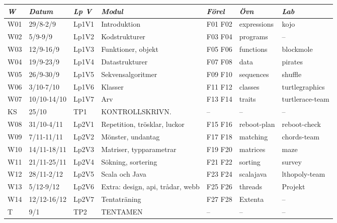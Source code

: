 \begin{tabular}{l|l|l|l|l|l|l}
\textit{W} & \textit{Datum} & \textit{Lp V} & \textit{Modul} & \textit{Förel} & \textit{Övn} & \textit{Lab} \\ \hline \hline
W01 & 29/8-2/9 & Lp1V1 & Introduktion & F01 F02 & expressions & kojo \\
W02 & 5/9-9/9 & Lp1V2 & Kodstrukturer & F03 F04 & programs & -- \\
W03 & 12/9-16/9 & Lp1V3 & Funktioner, objekt & F05 F06 & functions & blockmole \\
W04 & 19/9-23/9 & Lp1V4 & Datastrukturer & F07 F08 & data & pirates \\
W05 & 26/9-30/9 & Lp1V5 & Sekvensalgoritmer & F09 F10 & sequences & shuffle \\
W06 & 3/10-7/10 & Lp1V6 & Klasser & F11 F12 & classes & turtlegraphics \\
W07 & 10/10-14/10 & Lp1V7 & Arv & F13 F14 & traits & turtlerace-team \\
KS & 25/10 & TP1 & KONTROLLSKRIVN. & -- & -- & -- \\
W08 & 31/10-4/11 & Lp2V1 & Repetition, trösklar, luckor & F15 F16 & reboot-plan & reboot-check \\
W09 & 7/11-11/11 & Lp2V2 & Mönster, undantag & F17 F18 & matching & chords-team \\
W10 & 14/11-18/11 & Lp2V3 & Matriser, typparametrar & F19 F20 & matrices & maze \\
W11 & 21/11-25/11 & Lp2V4 & Sökning, sortering & F21 F22 & sorting & survey \\
W12 & 28/11-2/12 & Lp2V5 & Scala och Java & F23 F24 & scalajava & lthopoly-team \\
W13 & 5/12-9/12 & Lp2V6 & Extra: design, api, trådar, webb & F25 F26 & threads & Projekt \\
W14 & 12/12-16/12 & Lp2V7 & Tentaträning & F27 F28 & Extenta & -- \\
T & 9/1 & TP2 & TENTAMEN & -- & -- & -- \\
\end{tabular}

